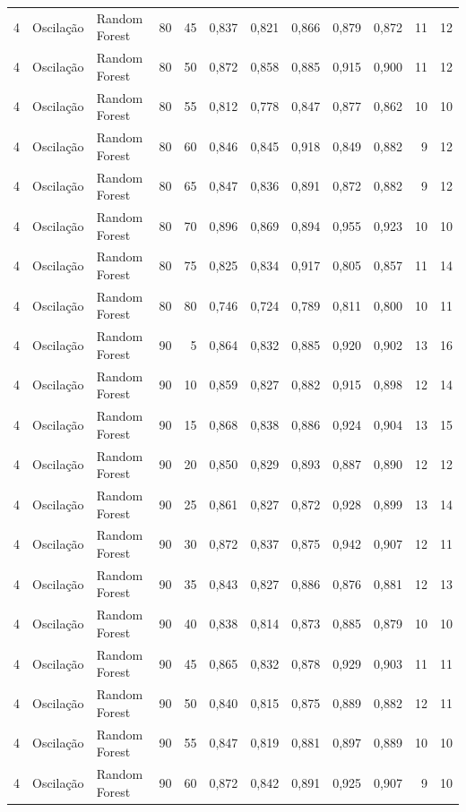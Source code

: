 \begin{longtable}{@{}rllrrrrrrrrr@{}}
4 & Oscilação & Random Forest & 80 & 45 & 0,837 & 0,821 & 0,866 & 0,879 & 0,872 & 11 & 12 \\
4 & Oscilação & Random Forest & 80 & 50 & 0,872 & 0,858 & 0,885 & 0,915 & 0,900 & 11 & 12 \\
4 & Oscilação & Random Forest & 80 & 55 & 0,812 & 0,778 & 0,847 & 0,877 & 0,862 & 10 & 10 \\
4 & Oscilação & Random Forest & 80 & 60 & 0,846 & 0,845 & 0,918 & 0,849 & 0,882 & 9 & 12 \\
4 & Oscilação & Random Forest & 80 & 65 & 0,847 & 0,836 & 0,891 & 0,872 & 0,882 & 9 & 12 \\
4 & Oscilação & Random Forest & 80 & 70 & 0,896 & 0,869 & 0,894 & 0,955 & 0,923 & 10 & 10 \\
4 & Oscilação & Random Forest & 80 & 75 & 0,825 & 0,834 & 0,917 & 0,805 & 0,857 & 11 & 14 \\
4 & Oscilação & Random Forest & 80 & 80 & 0,746 & 0,724 & 0,789 & 0,811 & 0,800 & 10 & 11 \\
4 & Oscilação & Random Forest & 90 & 5 & 0,864 & 0,832 & 0,885 & 0,920 & 0,902 & 13 & 16 \\
4 & Oscilação & Random Forest & 90 & 10 & 0,859 & 0,827 & 0,882 & 0,915 & 0,898 & 12 & 14 \\
4 & Oscilação & Random Forest & 90 & 15 & 0,868 & 0,838 & 0,886 & 0,924 & 0,904 & 13 & 15 \\
4 & Oscilação & Random Forest & 90 & 20 & 0,850 & 0,829 & 0,893 & 0,887 & 0,890 & 12 & 12 \\
4 & Oscilação & Random Forest & 90 & 25 & 0,861 & 0,827 & 0,872 & 0,928 & 0,899 & 13 & 14 \\
4 & Oscilação & Random Forest & 90 & 30 & 0,872 & 0,837 & 0,875 & 0,942 & 0,907 & 12 & 11 \\
4 & Oscilação & Random Forest & 90 & 35 & 0,843 & 0,827 & 0,886 & 0,876 & 0,881 & 12 & 13 \\
4 & Oscilação & Random Forest & 90 & 40 & 0,838 & 0,814 & 0,873 & 0,885 & 0,879 & 10 & 10 \\
4 & Oscilação & Random Forest & 90 & 45 & 0,865 & 0,832 & 0,878 & 0,929 & 0,903 & 11 & 11 \\
4 & Oscilação & Random Forest & 90 & 50 & 0,840 & 0,815 & 0,875 & 0,889 & 0,882 & 12 & 11 \\
4 & Oscilação & Random Forest & 90 & 55 & 0,847 & 0,819 & 0,881 & 0,897 & 0,889 & 10 & 10 \\
4 & Oscilação & Random Forest & 90 & 60 & 0,872 & 0,842 & 0,891 & 0,925 & 0,907 & 9 & 10 \\

\end{longtable}
